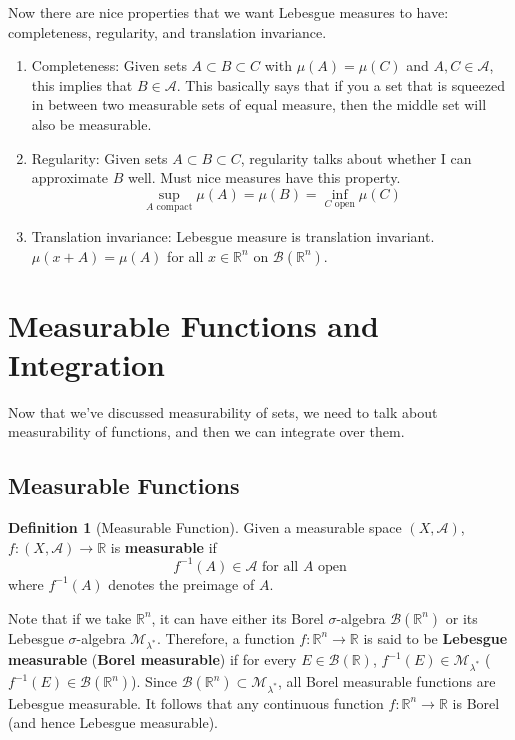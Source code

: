 \documentclass{article}
\theoremstyle{remark}
\theoremstyle{definition}
\newtheorem{definition}{Definition}[section]
\begin{document}
Now there are nice properties that we want Lebesgue measures to have: completeness, regularity, and translation invariance. 
\begin{enumerate}
    \item Completeness: Given sets $A \subset B \subset C$ with $\mu(A) = \mu(C)$ and $A, C \in \mathcal{A}$, this implies that $B \in \mathcal{A}$. This basically says that if you a set that is squeezed in between two measurable sets of equal measure, then the middle set will also be measurable. 
    \item Regularity: Given sets $A \subset B \subset C$, regularity talks about whether I can approximate $B$ well. Must nice measures have this property. 
    \[\sup_{A \text{ compact}} \mu(A) = \mu(B) = \inf_{C \text{ open}} \mu(C)\]
    \item Translation invariance: Lebesgue measure is translation invariant. $\mu(x + A) = \mu(A)$ for all $x \in \mathbb{R}^n$ on $\mathcal{B}(\mathbb{R}^n)$. 
\end{enumerate}

\section{Measurable Functions and Integration}

Now that we've discussed measurability of sets, we need to talk about measurability of functions, and then we can integrate over them.  

\subsection{Measurable Functions}

\begin{definition}[Measurable Function]
Given a measurable space $(X, \mathcal{A})$, $f: (X, \mathcal{A}) \longrightarrow \mathbb{R}$ is \textbf{measurable} if 
\[f^{-1}(A) \in \mathcal{A} \text{ for all } A \text{ open}\]
where $f^{-1}(A)$ denotes the preimage of $A$. 
\end{definition}

Note that if we take $\mathbb{R}^n$, it can have either its Borel $\sigma$-algebra $\mathcal{B}(\mathbb{R}^n)$ or its Lebesgue $\sigma$-algebra $\mathcal{M}_{\lambda^*}$. Therefore, a function $f: \mathbb{R}^n \longrightarrow \mathbb{R}$ is said to be \textbf{Lebesgue measurable} (\textbf{Borel measurable}) if for every $E \in \mathcal{B}(\mathbb{R})$, $f^{-1}(E) \in \mathcal{M}_{\lambda^*}$ ($f^{-1}(E) \in \mathcal{B}(\mathbb{R}^n)$). Since $\mathcal{B}(\mathbb{R}^n) \subset \mathcal{M}_{\lambda^*}$, all Borel measurable functions are Lebesgue measurable. It follows that any continuous function $f: \mathbb{R}^n \longrightarrow \mathbb{R}$ is Borel (and hence Lebesgue measurable). 
\end{document}
